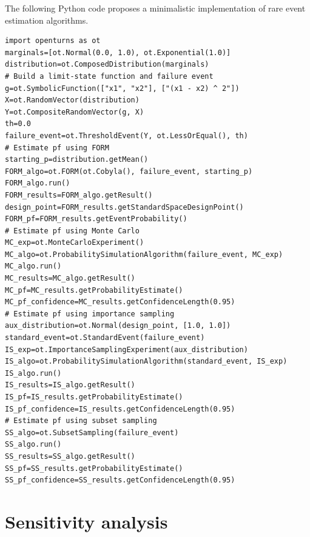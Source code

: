\begin{otexample}
    The following Python code proposes a minimalistic \ot implementation of rare event estimation algorithms. 
    \lstset{style=mystyle, language=python}
\begin{lstlisting}
import openturns as ot
marginals=[ot.Normal(0.0, 1.0), ot.Exponential(1.0)]
distribution=ot.ComposedDistribution(marginals)
# Build a limit-state function and failure event
g=ot.SymbolicFunction(["x1", "x2"], ["(x1 - x2) ^ 2"])
X=ot.RandomVector(distribution)
Y=ot.CompositeRandomVector(g, X)
th=0.0
failure_event=ot.ThresholdEvent(Y, ot.LessOrEqual(), th)
# Estimate pf using FORM
starting_p=distribution.getMean()
FORM_algo=ot.FORM(ot.Cobyla(), failure_event, starting_p)
FORM_algo.run()
FORM_results=FORM_algo.getResult()
design_point=FORM_results.getStandardSpaceDesignPoint()
FORM_pf=FORM_results.getEventProbability()
# Estimate pf using Monte Carlo 
MC_exp=ot.MonteCarloExperiment()
MC_algo=ot.ProbabilitySimulationAlgorithm(failure_event, MC_exp)
MC_algo.run()
MC_results=MC_algo.getResult()
MC_pf=MC_results.getProbabilityEstimate()
MC_pf_confidence=MC_results.getConfidenceLength(0.95)
# Estimate pf using importance sampling
aux_distribution=ot.Normal(design_point, [1.0, 1.0])
standard_event=ot.StandardEvent(failure_event)
IS_exp=ot.ImportanceSamplingExperiment(aux_distribution)
IS_algo=ot.ProbabilitySimulationAlgorithm(standard_event, IS_exp)
IS_algo.run()
IS_results=IS_algo.getResult()
IS_pf=IS_results.getProbabilityEstimate()
IS_pf_confidence=IS_results.getConfidenceLength(0.95)
# Estimate pf using subset sampling
SS_algo=ot.SubsetSampling(failure_event)
SS_algo.run()
SS_results=SS_algo.getResult()
SS_pf=SS_results.getProbabilityEstimate()
SS_pf_confidence=SS_results.getConfidenceLength(0.95)
\end{lstlisting}
\end{otexample}




\newpage
\section{Sensitivity analysis}

